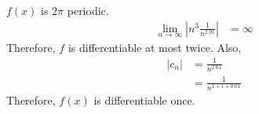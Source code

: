 \documentclass[fleqn, a4paper, 12pt, twoside]{article}
\theoremstyle{definition}
\theoremstyle{theorem}
\begin{document}
\begin{solution}
	$f(x)$ is $2 \pi$ periodic.
	\begin{align*}
		\lim\limits_{n \to \infty} \left| n^3 \frac{1}{n^{2.01}} \right| & = \infty
	\end{align*}
	Therefore, $f$ is differentiable at most twice.
	Also,
	\begin{align*}
		|c_n| & = \frac{1}{n^{2.01}} \\
                      & = \frac{1}{n^{1 + 1 + 0.01}}
	\end{align*}
	Therefore, $f(x)$ is differentiable once.\\
\end{solution}
\end{document}
